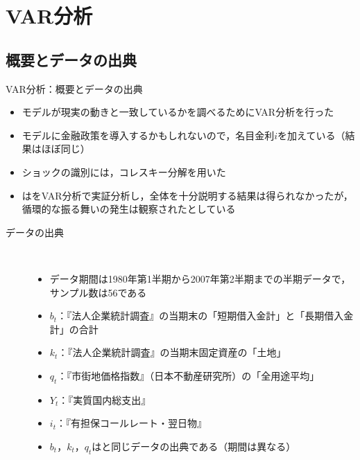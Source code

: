 \documentclass[aspectratio=169, dvipdfmx, 11pt, uplatex]{beamer}
\begin{document}
\section{VAR分析}
\subsection{概要とデータの出典}
\begin{frame}{VAR分析：概要とデータの出典}
  \begin{itemize}
    \item モデルが現実の動きと一致しているかを調べるためにVAR分析を行った
    \item モデルに金融政策を導入するかもしれないので，名目金利$i$を加えている（結果はほぼ同じ）
    \item ショックの識別には，コレスキー分解を用いた
    \item \textcite{U2005}は\textcite{KM1997}をVAR分析で実証分析し，全体を十分説明する結果は得られなかったが，循環的な振る舞いの発生は観察されたとしている
  \end{itemize}
  \begin{description}
    \item[データの出典] \mbox{} \\
      \begin{itemize}
        \item データ期間は1980年第1半期から2007年第2半期までの半期データで，サンプル数は56である
        \item $b_t$：『法人企業統計調査』の当期末の「短期借入金計」と「長期借入金計」の合計
        \item $k_t$：『法人企業統計調査』の当期末固定資産の「土地」
        \item $q_t$：『市街地価格指数』（日本不動産研究所）の「全用途平均」
        \item $Y_t$：『実質国内総支出』
        \item $i_t$：『有担保コールレート・翌日物』
        \item $b_t$，$k_t$，$q_t$は\textcite{U2005}と同じデータの出典である（期間は異なる）
      \end{itemize}
  \end{description}
\end{frame}
\end{document}
